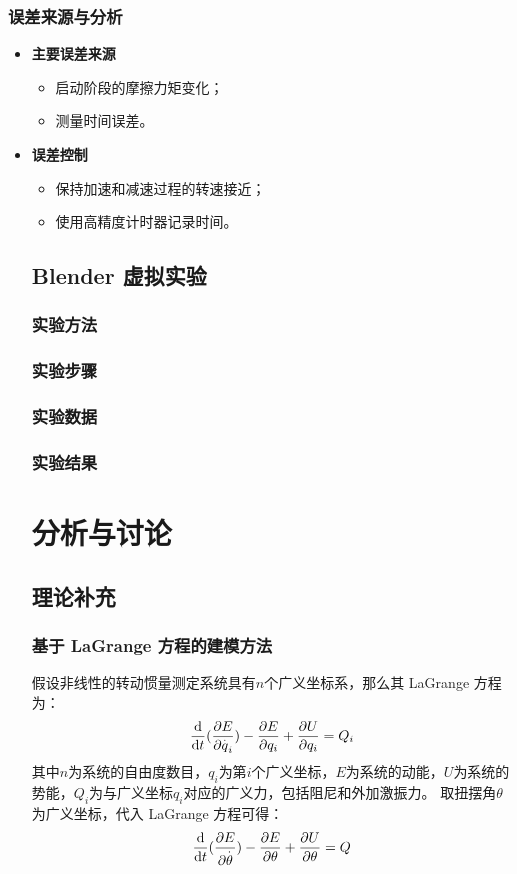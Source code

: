 \documentclass[12pt,hyperref,a4paper,UTF8]{ctexart}
\begin{document}
\subsubsection{误差来源与分析}
    \begin{itemize}
        \item \textbf{主要误差来源}
        \begin{itemize}
            \item 启动阶段的摩擦力矩变化；
            \item 测量时间误差。
        \end{itemize}
        \item \textbf{误差控制}
        \begin{itemize}
            \item 保持加速和减速过程的转速接近；
            \item 使用高精度计时器记录时间。
        \end{itemize}

\subsection{Blender 虚拟实验}
\subsubsection{实验方法}

\subsubsection{实验步骤}

\subsubsection{实验数据}

\subsubsection{实验结果}


\section{分析与讨论}

\subsection{理论补充}
\subsubsection{基于 LaGrange 方程的建模方法}
假设非线性的转动惯量测定系统具有$n$个广义坐标系，那么其 LaGrange 方程为：
$$ \frac{\text d}{\text dt}(\frac{\partial E}{\partial\overset{.}q_i})-\frac{\partial E}{\partial q_i}+\frac{\partial U}{\partial q_i}=Q_i $$
其中$n$为系统的自由度数目，$q_i$为第$i$个广义坐标，$E$为系统的动能，$U$为系统的势能，$Q_i$为与广义坐标$q_i$对应的广义力，包括阻尼和外加激振力。
取扭摆角$\theta$为广义坐标，代入 LaGrange 方程可得：
$$ \frac{\text d}{\text dt}(\frac{\partial E}{\partial\overset{.}\theta})-\frac{\partial E}{\partial \theta}+\frac{\partial U}{\partial \theta}=Q $$


\end{itemize}
\end{document}
